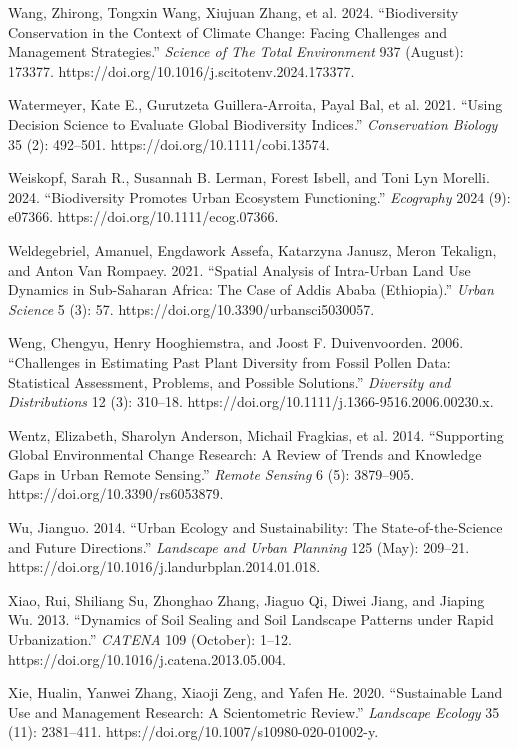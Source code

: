 Wang, Zhirong, Tongxin Wang, Xiujuan Zhang, et al. 2024. ``Biodiversity Conservation in the Context of Climate Change: Facing Challenges and Management Strategies.'' \emph{Science of The Total Environment} 937 (August): 173377. https://doi.org/10.1016/j.scitotenv.2024.173377.

Watermeyer, Kate E., Gurutzeta Guillera‐Arroita, Payal Bal, et al. 2021. ``Using Decision Science to Evaluate Global Biodiversity Indices.'' \emph{Conservation Biology} 35 (2): 492--501. https://doi.org/10.1111/cobi.13574.

Weiskopf, Sarah R., Susannah B. Lerman, Forest Isbell, and Toni Lyn Morelli. 2024. ``Biodiversity Promotes Urban Ecosystem Functioning.'' \emph{Ecography} 2024 (9): e07366. https://doi.org/10.1111/ecog.07366.

Weldegebriel, Amanuel, Engdawork Assefa, Katarzyna Janusz, Meron Tekalign, and Anton Van Rompaey. 2021. ``Spatial Analysis of Intra-Urban Land Use Dynamics in Sub-Saharan Africa: The Case of Addis Ababa (Ethiopia).'' \emph{Urban Science} 5 (3): 57. https://doi.org/10.3390/urbansci5030057.

Weng, Chengyu, Henry Hooghiemstra, and Joost F. Duivenvoorden. 2006. ``Challenges in Estimating Past Plant Diversity from Fossil Pollen Data: Statistical Assessment, Problems, and Possible Solutions.'' \emph{Diversity and Distributions} 12 (3): 310--18. https://doi.org/10.1111/j.1366-9516.2006.00230.x.

Wentz, Elizabeth, Sharolyn Anderson, Michail Fragkias, et al. 2014. ``Supporting Global Environmental Change Research: A Review of Trends and Knowledge Gaps in Urban Remote Sensing.'' \emph{Remote Sensing} 6 (5): 3879--905. https://doi.org/10.3390/rs6053879.

Wu, Jianguo. 2014. ``Urban Ecology and Sustainability: The State-of-the-Science and Future Directions.'' \emph{Landscape and Urban Planning} 125 (May): 209--21. https://doi.org/10.1016/j.landurbplan.2014.01.018.

Xiao, Rui, Shiliang Su, Zhonghao Zhang, Jiaguo Qi, Diwei Jiang, and Jiaping Wu. 2013. ``Dynamics of Soil Sealing and Soil Landscape Patterns under Rapid Urbanization.'' \emph{CATENA} 109 (October): 1--12. https://doi.org/10.1016/j.catena.2013.05.004.

Xie, Hualin, Yanwei Zhang, Xiaoji Zeng, and Yafen He. 2020. ``Sustainable Land Use and Management Research: A Scientometric Review.'' \emph{Landscape Ecology} 35 (11): 2381--411. https://doi.org/10.1007/s10980-020-01002-y.

